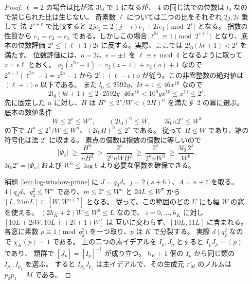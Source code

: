 \begin{proof}
\(\ell=2\) の場合は比が法 \(3l_0\) で \(1\) になるが、
\(4\) の同じ法での位数は \(l_0\) なので禁じられた比は生じない。
奇素数 \(\ell\) については二つの比をそれぞれ \(2j,2i\) 乗して
法 \(2^{s+v}\) で比較すると
\(2j e_2\equiv2(j-i)e_1+2i e_3\pmod{2^s}\) となる。
指数の性質から \(e_1=e_2=e_3\) である。しかしこの場合
\(\ell^{2i}\equiv1\pmod{2^{s+1}}\) となり、底本の位数評価
\(2^s\le(\ell+1)2i\) に反する。実際、ここでは
\(2l_0(kt+1)<2^s\) を満たす。
位数評価には、\(o=2i\)、\(\epsilon=\pm1\) を \(\ell\equiv\epsilon\bmod4\)
となるように取って \(z=\epsilon\ell\) とおく。
\(v_2(z^{2o}-1)=v_2(z-1)+v_2(o)+1\) なので
\(2^{s+1}\mid\ell^{2o}-1=z^{2o}-1\) から \(2^s\mid(\ell-\epsilon)o\)
が従う。この非零整数の絶対値は \((\ell+1)o\) 以下である。
また \(l_0\le2592y\)、\(kt+1\le46x^{10}\) なので
\[
 2l_0(kt+1)\le2\cdot2592y\cdot46x^{10}
   <10^6yx^{10}\le x^{11}\le2^s.
\]
先に固定した \(n\) に対し、\(H\) は
\(H^n\le 2^s/W<(2H)^n\) を満たす \(2\) の冪に選ぶ。
底本の数値条件
\[
 W\le 2^s\le W^n,\qquad (2l_0)^n\le W,\qquad
 3l_0 n2^n\le W^3
\]
の下で \(H^n\le2^s/W\le W^n\)、\((2l_0H)^n\le2^s\) である。
従って \(H\le W\) であり、箱の符号化は法 \(2^s\) に収まる。
素点の個数は指数の個数に等しいので
\[
 |\Phi_b|\ \ge \ \frac{H^n}{nH^2} \ >\
 \frac{2^s}{2^n n W H^2}\ \ge\
 \frac{2^s}{2^n n W^3}\ \ge\ \frac{3l_0\,2^s}{W^6}.
\]
\(3l_0 2^s=|\Phi_a|\) および \(W^6\le\log b\) より必要な個数を確保できる。

補題 \ref{lem:log-window-prime} に \(J=q_0d\)、\(j=2(s+6)\)、\(A=n+7\) を取る。
\(4\mid q_0d\)、\(q_2^2\le W^n\) であり、\(m\le2^s\le W^n\) と
\(24L\le W^7\) から \([L,24mL]\subseteq[W,W^{n+7}]\) となる。
従って、この範囲のどの \(U\) にも幅 \(W\) の窓を使える。
\((2h_K+2)W\le W^2\le L\) なので、
\(i=0,\ldots,h_K\) に対し \([10L+2iW,10L+(2i+1)W]\) は
互いに交わらず、\([10L,11L]\) に含まれる。
各窓に素数 \(p\equiv1\pmod{q_2^2}\) を一つ取り、\(p\) は \(K\) で分裂する。
実際 \(d\mid q_2^2\) なので \(\chi_K(p)=1\) である。
上の二つの素イデアルを \(I_p,J_p\) とすると \(I_pJ_p=(p)\) であり、
類群で \([J_p]=[I_p]^{-1}\) が成り立つ。
\(h_K+1\) 個の \(I_p\) から同じ類の \(I_{p_0},I_{p_1}\) を選ぶ。
すると \(I_{p_0}J_{p_1}\) は主イデアルで、その生成元
\(\overline{\pi_M}\) のノルムは \(p_0p_1=M\) である。


\end{proof}
